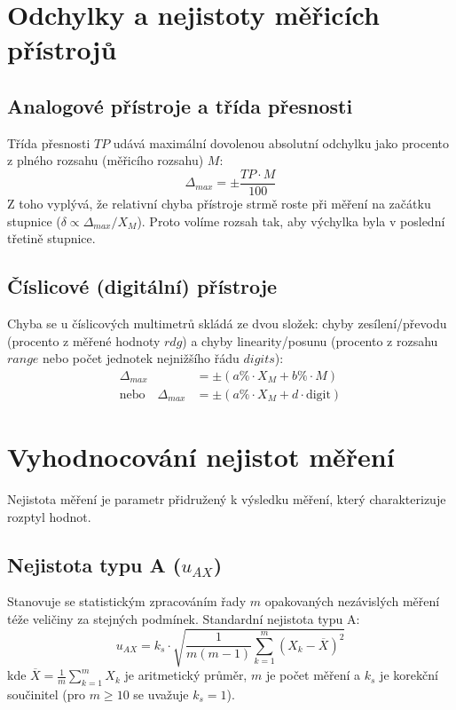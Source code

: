 \section{Odchylky a nejistoty měřicích přístrojů}

\subsection{Analogové přístroje a třída přesnosti}
Třída přesnosti $TP$ udává maximální dovolenou absolutní odchylku jako procento z plného rozsahu (měřicího rozsahu) $M$:
\[ \Delta_{max} = \pm \frac{TP \cdot M}{100} \]
Z toho vyplývá, že relativní chyba přístroje strmě roste při měření na začátku stupnice ($\delta \propto \Delta_{max}/X_M$). Proto volíme rozsah tak, aby výchylka byla v poslední třetině stupnice.

\subsection{Číslicové (digitální) přístroje}
Chyba se u číslicových multimetrů skládá ze dvou složek: chyby zesílení/převodu (procento z měřené hodnoty $rdg$) a chyby linearity/posunu (procento z rozsahu $range$ nebo počet jednotek nejnižšího řádu $digits$):
\begin{align*}
\Delta_{max} &= \pm (a\% \cdot X_M + b\% \cdot M) \\
\text{nebo} \quad \Delta_{max} &= \pm (a\% \cdot X_M + d \cdot \text{digit})
\end{align*}

\section{Vyhodnocování nejistot měření}
Nejistota měření je parametr přidružený k výsledku měření, který charakterizuje rozptyl hodnot.

\subsection{Nejistota typu A (\texorpdfstring{$u_{AX}$}{u_AX})}
Stanovuje se statistickým zpracováním řady $m$ opakovaných nezávislých měření téže veličiny za stejných podmínek. Standardní nejistota typu A:
\[ u_{AX} = k_s \cdot \sqrt{\frac{1}{m(m-1)} \sum_{k=1}^{m} (X_k - \overline{X})^2} \]
kde $\overline{X} = \frac{1}{m}\sum_{k=1}^m X_k$ je aritmetický průměr, $m$ je počet měření a $k_s$ je korekční součinitel (pro $m \ge 10$ se uvažuje $k_s = 1$).

